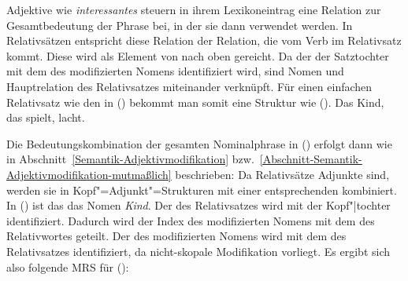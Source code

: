 Adjektive wie \emph{interessantes} steuern in ihrem Lexikoneintrag eine Relation zur Gesamtbedeutung
der Phrase bei, in der sie dann verwendet werden. In Relativsätzen entspricht diese Relation der Relation, die
vom Verb im Relativsatz kommt. Diese wird als Element von \rels nach oben gereicht. Da der \ltopw
der Satztochter mit dem \ltopw des modifizierten Nomens identifiziert wird, sind Nomen und
Hauptrelation des Relativsatzes miteinander verknüpft. Für einen einfachen Relativsatz wie den in
() bekommt man somit eine Struktur wie ().
\ea
Das Kind, das spielt, lacht.
\z
\begin{figure}
\ea
\ms{ phon & \phonliste{ das, spielt }\\
   loc & \ms{ cat & \ms{ head & \ms[relativizer]
                                { %
                                   mod &  \upshape \nbar\ind{1}] } \\
                         spr   & \eliste\\
                         comps & \eliste } \\
              cont & \ms{ ltop & \ibox{2}\\
                          ind & \ibox{3} } } \\
   nonloc & \ms{ rels & \eliste\\
                 slash & \eliste}\\
rels & \liste{\ms[spielen]{ 
                lbl  & \ibox{2} \\
                arg0 & \ibox{3} event\\
                arg1 & \ibox{1} }} }
\z
\vspace{-\baselineskip}
\end{figure}
Die Bedeutungskombination der gesamten Nominalphrase in () erfolgt dann wie in
Abschnitt~\ref{Semantik-Adjektivmodifikation} bzw.~\ref{Abschnitt-Semantik-Adjektivmodifikation-mutmaßlich} beschrieben: Da Relativsätze Adjunkte sind, werden sie in Kopf"=Adjunkt"=Strukturen
mit einer entsprechenden \nbar kombiniert. In () ist das das Nomen \emph{Kind}. Der \modw des Relativsatzes
wird mit der Kopf"|tochter identifiziert. Dadurch wird der Index des modifizierten Nomens mit dem
des Relativwortes geteilt. Der \ltopw des modifizierten Nomens wird mit dem des
Relativsatzes identifiziert, da nicht-skopale Modifikation vorliegt. Es ergibt sich also folgende MRS für ():
\ea
{}
